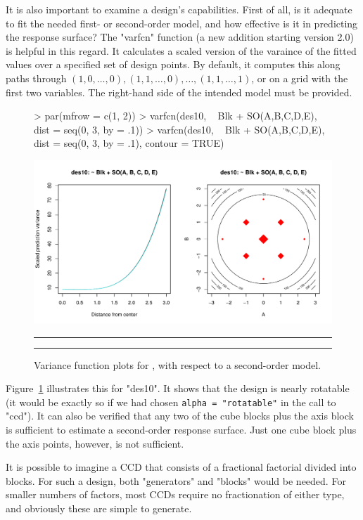 \documentclass[article,nojss]{jss}
\begin{document}
It is also important to examine a design's capabilities. First of all, is it adequate to fit the needed first- or second-order model, and how effective is it in predicting the response surface? The "varfcn" function (a new addition starting  version 2.0) is helpful in this regard. It calculates a scaled version of the varaince of the fitted values over a specified set of design points. By default, it computes this along paths through $(1,0,\ldots,0),(1,1,\ldots,0),\ldots,(1,1,\ldots,1)$, or on a grid with the first two variables. The right-hand side of the intended model must be provided. 
\begin{figure}
{\small
\begin{Schunk}
\begin{Sinput}
> par(mfrow = c(1, 2))
> varfcn(des10, ~ Blk + SO(A,B,C,D,E), dist = seq(0, 3, by = .1))
> varfcn(des10, ~ Blk + SO(A,B,C,D,E), dist = seq(0, 3, by = .1), contour = TRUE)
\end{Sinput}
\end{Schunk}
}
\includegraphics[width=.8\textwidth]{rsm-varfcn.pdf}
\caption{Variance function plots for , with respect to a second-order model.}\label{varfcn}
\rule{18pt}{0pt}\hrule
\end{figure}

Figure~\ref{varfcn} illustrates this for "des10".
It shows that the design is nearly rotatable (it would be exactly so if we had chosen \verb|alpha = "rotatable"| in the call to "ccd").
It can also be verified that any two of the cube blocks plus the axis block is sufficient
to estimate a second-order response surface. Just one cube block plus the axis points, however, is not sufficient.

It is possible to imagine a CCD that consists of a fractional factorial divided into blocks.  For such a design, both "generators" and "blocks" would be needed.  For smaller numbers of factors, most CCDs require no fractionation of either type, and obviously these are simple to generate.
\end{document}
